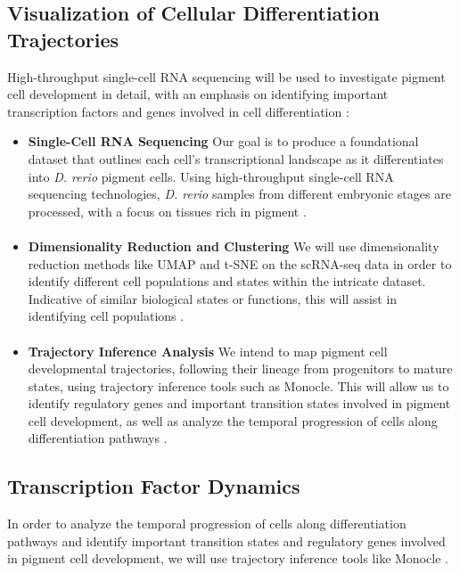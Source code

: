 \documentclass[runningheads]{llncs}
\begin{document}
\subsection{Visualization of Cellular Differentiation Trajectories}
High-throughput single-cell RNA sequencing will be used to investigate pigment cell development in detail, with an emphasis on identifying important transcription factors and genes involved in cell differentiation \cite{srivatsan2020massively,kulkarni2019beyond}:
    \begin{itemize}
        \item \textbf{Single-Cell RNA Sequencing}
        Our goal is to produce a foundational dataset that outlines each cell's transcriptional landscape as it differentiates into \textit{D. rerio} pigment cells. Using high-throughput single-cell RNA sequencing technologies, \textit{D. rerio} samples from different embryonic stages are processed, with a focus on tissues rich in pigment \cite{srivatsan2020massively}.
        \paragraph{}
        \item \textbf{Dimensionality Reduction and Clustering}
        We will use dimensionality reduction methods like UMAP and t-SNE on the scRNA-seq data in order to identify different cell populations and states within the intricate dataset. Indicative of similar biological states or functions, this will assist in identifying cell populations \cite{kulkarni2019beyond,nayak2021hitchhiker}.
        \paragraph{}
        \item \textbf{Trajectory Inference Analysis}
        We intend to map pigment cell developmental trajectories, following their lineage from progenitors to mature states, using trajectory inference tools such as Monocle. This will allow us to identify regulatory genes and important transition states involved in pigment cell development, as well as analyze the temporal progression of cells along differentiation pathways \cite{qiu2017reversed}.        
    \end{itemize}
    
\subsection{Transcription Factor Dynamics}
In order to analyze the temporal progression of cells along differentiation pathways and identify important transition states and regulatory genes involved in pigment cell development, we will use trajectory inference tools like Monocle \cite{qiu2017reversed}.
\end{document}
